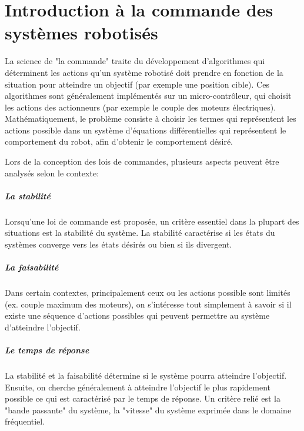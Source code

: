 \chapter{Introduction à la commande des systèmes robotisés}
\label{sec:introcommanderobots}

La science de "la commande" traite du développement d'algorithmes qui déterminent les actions qu'un système robotisé doit prendre en fonction de la situation pour atteindre un objectif (par exemple une position cible). Ces algorithmes sont généralement implémentés sur un micro-contrôleur, qui choisit les actions des actionneurs (par exemple le couple des moteurs électriques). Mathématiquement, le problème consiste à choisir les termes qui représentent les actions possible dans un système d'équations différentielles qui représentent le comportement du robot, afin d'obtenir le comportement désiré.

Lors de la conception des lois de commandes, plusieurs aspects peuvent être analysés selon le contexte: 

\paragraph{La stabilité} 

Lorsqu'une loi de commande est proposée, un critère essentiel dans la plupart des situations est la stabilité du système. La stabilité caractérise si les états du systèmes converge vers les états désirés ou bien si ils divergent. 

\paragraph{La faisabilité} 

Dans certain contextes, principalement ceux ou les actions possible sont limités (ex. couple maximum des moteurs), on s'intéresse tout simplement à savoir si il existe une séquence d'actions possibles qui peuvent permettre au système d'atteindre l'objectif. 

\paragraph{Le temps de réponse} 

La stabilité et la faisabilité détermine si le système pourra atteindre l'objectif. Ensuite, on cherche généralement à atteindre l'objectif le plus rapidement possible ce qui est caractérisé par le temps de réponse. Un critère relié est la "bande passante" du système, la "vitesse" du système exprimée dans le domaine fréquentiel.

